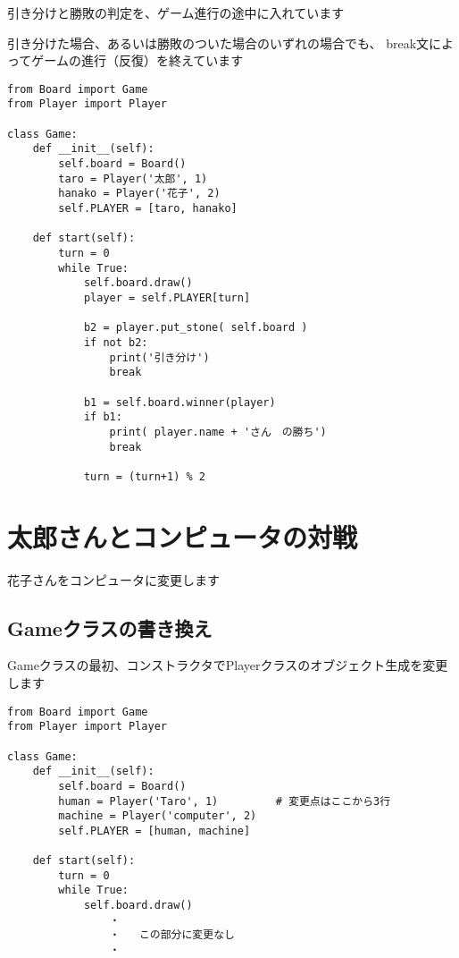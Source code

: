 \documentclass[uplatex,a4paper,11pt,oneside,openany]{jsbook}
\begin{document}
引き分けと勝敗の判定を、ゲーム進行の途中に入れています

引き分けた場合、あるいは勝敗のついた場合のいずれの場合でも、
break文によってゲームの進行（反復）を終えています

\begin{lstlisting}[caption=class Game,label=prog03-6]
from Board import Game
from Player import Player

class Game:
    def __init__(self):
        self.board = Board()
        taro = Player('太郎', 1)
        hanako = Player('花子', 2)
        self.PLAYER = [taro, hanako]

    def start(self):
        turn = 0
        while True:
            self.board.draw()
            player = self.PLAYER[turn]

            b2 = player.put_stone( self.board )
            if not b2:
                print('引き分け')
                break

            b1 = self.board.winner(player)
            if b1:
                print( player.name + 'さん　の勝ち')
                break

            turn = (turn+1) % 2
\end{lstlisting}%

\section{太郎さんとコンピュータの対戦}

花子さんをコンピュータに変更します

\subsection{Gameクラスの書き換え}

Gameクラスの最初、コンストラクタでPlayerクラスのオブジェクト生成を変更します

\begin{lstlisting}[caption=class Game,label=prog04-1]
from Board import Game
from Player import Player

class Game:
    def __init__(self):
        self.board = Board()
        human = Player('Taro', 1)         # 変更点はここから3行
        machine = Player('computer', 2)
        self.PLAYER = [human, machine]

    def start(self):
        turn = 0
        while True:
            self.board.draw()
                ・
                ・   この部分に変更なし
                ・
\end{lstlisting}%
\end{document}
